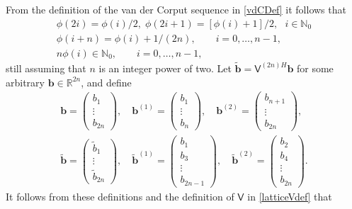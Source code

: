 \documentclass[twocolumn]{svjour3}          %
\newcommand{\bm}[1]{\boldsymbol{#1}}
\newcommand{\natzero}{\mathbb{N}_0}
\newcommand{\reals}{\mathbb{R}}
\newcommand{\vb}{\bm{b}}
\newcommand{\mV}{\mathsf{V}}
\begin{document}
From the definition of the van der Corput sequence in \eqref{vdCDef} it follows that
\begin{gather} 
\label{vdCProp}
\phi(2i) = \phi(i)/2, \;  \phi(2i+1) = [\phi(i)+1]/2, \ \ \ i \in \natzero\\
\label{vdCPropB}
\phi(i+n) = \phi(i) + 1/(2n), \qquad i = 0, \ldots, n-1,
\\
\label{vdCPropC}
n \phi(i) \in \natzero, \qquad i = 0, \ldots, n-1,
\end{gather}
still assuming that $n$ is an integer power of two.
Let $\widetilde{\vb} = \mV^{(2n)H}\vb$ for some arbitrary $\vb \in \reals^{2n}$, and define
\begin{gather*}
\vb = \begin{pmatrix} b_1 \\ \vdots \\ b_{2n} \end{pmatrix}, \quad 
\vb^{(1)} = \begin{pmatrix} b_1 \\ \vdots \\ b_{n} \end{pmatrix}, \quad 
\vb^{(2)}  = \begin{pmatrix} b_{n+1} \\ \vdots \\ b_{2n} \end{pmatrix}, \\ 
\widetilde{\vb} = \begin{pmatrix} \widetilde{b}_1 \\ \vdots \\ \widetilde{b}_{2n} \end{pmatrix}, \quad 
\widetilde{\vb}^{(1)} = \begin{pmatrix} b_1 \\ b_3 \\ \vdots \\ b_{2n-1} \end{pmatrix}, \quad 
\widetilde{\vb}^{(2)}  = \begin{pmatrix} b_{2} \\  b_{4} \\ \vdots \\ b_{2n} \end{pmatrix}. 
\end{gather*}
It follows from these definitions and the definition of $\mV$ in  \eqref{latticeVdef} that
\end{document}
